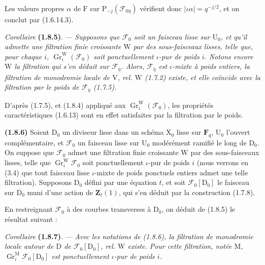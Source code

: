 \documentclass[11pt,leqno]{article}
\begin{document}
Les valeurs propres \(\alpha\) de \(\mathrm{F}\) sur \(\mathrm{P}_{-j}(\mathscr{F}_{0\bar{\eta}})\) vérifient donc \(|\iota\alpha|=q^{-j/2}\), et on conclut par (1.6.14.3).

\textit{Corollaire} \textbf{(1.8.5)}. — \textit{Supposons que \(\mathscr{F}_0\) soit un faisceau lisse sur \(\mathrm{U}_0\), et qu’il admette une filtration finie croissante \(\mathrm{W}\) par des sous-faisceaux lisses, telle que, pour chaque \(i\), \(\operatorname{Gr}_i^{\mathrm{W}}(\mathscr{F}_0)\) soit ponctuellement \(\iota\)-pur de poids \(i\). Notons encore \(\mathrm{W}\) la filtration qui s’en déduit sur \(\mathscr{F}_{\bar{\eta}}\). Alors, \(\mathscr{F}_{\bar{\eta}}\) est \(\iota\)-mixte à poids entiers, la filtration de monodromie locale de \(\mathrm{V}\), rel. \(\mathrm{W}\) \textup{(1.7.2)} existe, et elle coïncide avec la filtration par le poids de \(\mathscr{F}_{\bar{\eta}}\) \textup{(1.7.5)}.}

D’après (1.7.5), et (1.8.4) appliqué aux \(\operatorname{Gr}_i^{\mathrm{W}}(\mathscr{F}_0)\), les propriétés caractéristiques (1.6.13) sont en effet satisfaites par la filtration par le poids.

\textbf{(1.8.6)} Soient \(\mathrm{D}_0\) un diviseur lisse dans un schéma \(\mathrm{X}_0\) lisse sur \(\mathbf{F}_q\), \(\mathrm{U}_0\) l’ouvert complémentaire, et \(\mathscr{F}_0\) un faisceau lisse sur \(\mathrm{U}_0\) modérément ramifié le long de \(\mathrm{D}_0\). On suppose que \(\mathscr{F}_0\) admet une filtration finie croissante \(\mathrm{W}\) par des sous-faisceaux lisses, telle que \(\operatorname{Gr}_i^{\mathrm{W}}\mathscr{F}_0\) soit ponctuellement \(\iota\)-pur de poids \(i\) (nous verrons en (3.4) que tout faisceau lisse \(\iota\)-mixte de poids ponctuels entiers admet une telle filtration). Supposons \(\mathrm{D}_0\) défini par une équation \(t\), et soit \(\mathscr{F}_0[\mathrm{D}_0]\) le faisceau sur \(\mathrm{D}_0\) muni d’une action de \(\mathbf{Z}_\ell(1)\), qui s’en déduit par la construction (1.7.8).

En restreignant \(\mathscr{F}_0\) à des courbes transverses à \(\mathrm{D}_0\), on déduit de (1.8.5) le résultat suivant :

\textit{Corollaire} \textbf{(1.8.7)}. — \textit{Avec les notations de \textup{(1.8.6)}, la filtration de monodromie locale autour de \(\mathrm{D}\) de \(\mathscr{F}_0[\mathrm{D}_0]\), rel. \(\mathrm{W}\) existe. Pour cette filtration, notée \(\mathrm{M}\), \(\operatorname{Gr}_i^{\mathrm{M}}\mathscr{F}_0[\mathrm{D}_0]\) est ponctuellement \(\iota\)-pur de poids \(i\).}
\end{document}
